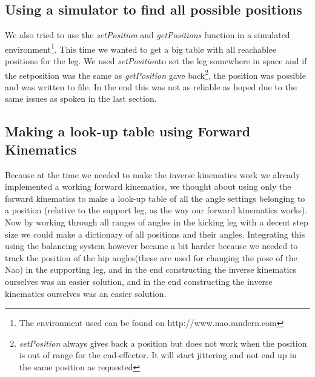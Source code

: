 \documentclass[a4paper]{article}
\begin{document}
\subsection{Using a simulator to find all possible positions}
We also tried to use the \emph{setPosition} and \emph{getPositions} function in
a simulated environment\footnote{The environment used can be found on
http://www.nao.sandern.com}. This time we wanted to get a big table with all
reachablee positions for the leg. We used \emph{setPosition}to set the leg
somewhere in space and if the setposition was the same as \emph{getPosition}
gave back\footnote{\emph{setPosition} always gives back a position but does not
work when the position is out of range for the end-effector. It will start
jittering and not end up in the same position as requested}, the position was possible and was written to file.
In the end this was not as reliable as hoped due to the same issues as spoken in
the last section.

\subsection{Making a look-up table using Forward Kinematics}
Because at the time we needed to make the inverse kinematics work we already
implemented a working forward kinematics, we thought about using only the
forward kinematics to make a look-up table of all the angle settings belonging
to a position (relative to the support leg, as the way our forward kinematics
works). Now by working through all ranges of angles in the kicking leg with a
decent step size we could make a dictionary of all positions and their angles. 
Integrating this using the balancing system however became a bit harder because
we needed to track the position of the hip angles(these are used for changing
the pose of the Nao) in the supporting leg, and in the end constructing the
inverse kinematics ourselves was an easier solution, and in the end constructing
the inverse kinematics ourselves was an easier solution.



\end{document}

